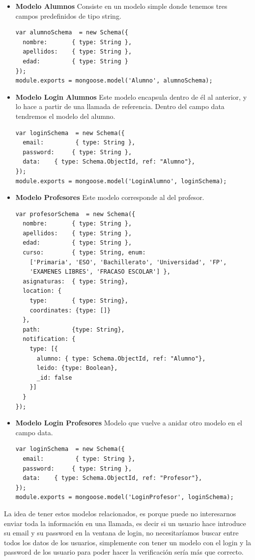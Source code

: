 \begin{itemize}
\item \textbf{Modelo Alumnos} Consiste en un modelo simple donde tenemos tres campos predefinidos de tipo string.
\begin{lstlisting}
var alumnoSchema  = new Schema({
  nombre:       { type: String },
  apellidos:    { type: String },
  edad:         { type: String }
});
module.exports = mongoose.model('Alumno', alumnoSchema);
\end{lstlisting}
\item \textbf{Modelo Login Alumnos} Este modelo encapsula dentro de él al anterior, y lo hace a partir de una llamada de referencia. Dentro del campo data tendremos el modelo del alumno.
\begin{lstlisting}
var loginSchema  = new Schema({
  email:         { type: String },
  password:     { type: String },
  data:    { type: Schema.ObjectId, ref: "Alumno"},
});
module.exports = mongoose.model('LoginAlumno', loginSchema);
\end{lstlisting}
\item \textbf{Modelo Profesores} Este modelo corresponde al del profesor.
\begin{lstlisting}
var profesorSchema  = new Schema({
  nombre:       { type: String },
  apellidos:    { type: String },
  edad:         { type: String },
  curso:        { type: String, enum:
    ['Primaria', 'ESO', 'Bachillerato', 'Universidad', 'FP',
    'EXAMENES LIBRES', 'FRACASO ESCOLAR'] },
  asignaturas:  { type: String},
  location: {
    type:       { type: String},
    coordinates: {type: []}
  },
  path:         {type: String},
  notification: {
    type: [{
      alumno: { type: Schema.ObjectId, ref: "Alumno"},
      leido: {type: Boolean},
      _id: false
    }]
  }
});
\end{lstlisting}
\item \textbf{Modelo Login Profesores} Modelo que vuelve a anidar otro modelo en el campo data.

\begin{lstlisting}
var loginSchema  = new Schema({
  email:         { type: String },
  password:     { type: String },
  data:    { type: Schema.ObjectId, ref: "Profesor"},
});
module.exports = mongoose.model('LoginProfesor', loginSchema);
\end{lstlisting}
\end{itemize}
La idea de tener estos modelos relacionados, es porque puede no interesarnos enviar toda la información en una llamada, es decir si un usuario hace introduce su email y su password en la ventana de login, no necesitaríamos buscar entre todos los datos de los usuarios, simplemente con tener un modelo con el login y la password de los usuario para poder hacer la verificación sería más que correcto.

